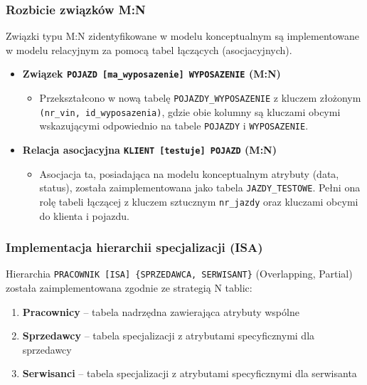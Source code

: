 \documentclass[a4paper,titleauthor]{mwart}
\begin{document}
	\subsubsection{Rozbicie związków M:N}

	Związki typu M:N zidentyfikowane w modelu konceptualnym są implementowane w modelu relacyjnym za pomocą tabel łączących (asocjacyjnych).

	\begin{itemize}
		\item \textbf{Związek \texttt{POJAZD [ma\_wyposazenie] WYPOSAZENIE} (M:N)}
		\begin{itemize}
			\item[$\rightarrow$] Przekształcono w nową tabelę \texttt{POJAZDY\_WYPOSAZENIE} z kluczem złożonym \texttt{(nr\_vin, id\_wyposazenia)}, gdzie obie kolumny są kluczami obcymi wskazującymi odpowiednio na tabele \texttt{POJAZDY} i \texttt{WYPOSAZENIE}.
		\end{itemize}
		
		\item \textbf{Relacja asocjacyjna \texttt{KLIENT [testuje] POJAZD} (M:N)}
		\begin{itemize}
			\item[$\rightarrow$] Asocjacja ta, posiadająca na modelu konceptualnym atrybuty (data, status), została zaimplementowana jako tabela \texttt{JAZDY\_TESTOWE}. Pełni ona rolę tabeli łączącej z kluczem sztucznym \texttt{nr\_jazdy} oraz kluczami obcymi do klienta i pojazdu.
		\end{itemize}
	\end{itemize}

	\subsubsection{Implementacja hierarchii specjalizacji (ISA)}

	Hierarchia \texttt{PRACOWNIK [ISA] \{SPRZEDAWCA, SERWISANT\}} (Overlapping, Partial) została zaimplementowana zgodnie ze strategią N tablic:

	\begin{enumerate}
		\item \textbf{Pracownicy} -- tabela nadrzędna zawierająca atrybuty wspólne
		\item \textbf{Sprzedawcy} -- tabela specjalizacji z atrybutami specyficznymi dla sprzedawcy
		\item \textbf{Serwisanci} -- tabela specjalizacji z atrybutami specyficznymi dla serwisanta
	\end{enumerate}
\end{document}
